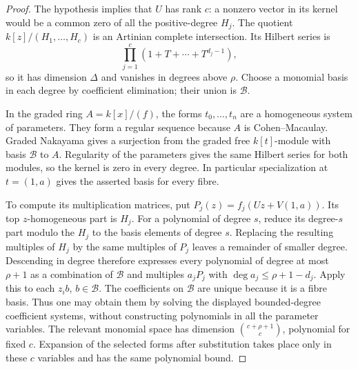 \begin{proof}
The hypothesis implies that \(U\) has rank \(c\): a nonzero vector
in its kernel would be a common zero of all the positive-degree
\(H_j\). The quotient \(k[z]/(H_1,\ldots,H_c)\) is an Artinian
complete intersection. Its Hilbert series is
\[
 \prod_{j=1}^c(1+T+\cdots+T^{d_j-1}),
\]
so it has dimension \(\Delta\) and vanishes in degrees above
\(\rho\). Choose a monomial basis in each degree by coefficient
elimination; their union is \(\mathcal B\).

In the graded ring \(A=k[x]/(f)\), the forms \(t_0,\ldots,t_n\)
are a homogeneous system of parameters. They form a regular sequence
because \(A\) is Cohen--Macaulay. Graded Nakayama gives a surjection
from the graded free \(k[t]\)-module with basis \(\mathcal B\) to
\(A\). Regularity of the parameters gives the same Hilbert series
for both modules, so the kernel is zero in every degree. In particular
specialization at \(t=(1,a)\) gives the asserted basis for every fibre.

To compute its multiplication matrices, put
\(P_j(z)=f_j(Uz+V(1,a))\). Its top \(z\)-homogeneous part is
\(H_j\). For a polynomial of degree \(s\), reduce its degree-\(s\)
part modulo the \(H_j\) to the basis elements of degree \(s\).
Replacing the resulting multiples of \(H_j\) by the same multiples
of \(P_j\) leaves a remainder of smaller degree. Descending in degree
therefore expresses every polynomial of degree at most \(\rho+1\)
as a combination of \(\mathcal B\) and multiples \(a_jP_j\) with
\(\deg a_j\leq\rho+1-d_j\). Apply this to each \(z_i b\),
\(b\in\mathcal B\). The coefficients on \(\mathcal B\) are unique
because it is a fibre basis. Thus one may obtain them by solving the
displayed bounded-degree coefficient systems, without constructing
polynomials in all the parameter variables. The relevant monomial
space has dimension \(\binom{c+\rho+1}{c}\), polynomial for fixed
\(c\). Expansion of the selected forms after substitution takes place
only in these \(c\) variables and has the same polynomial bound.
\end{proof}

